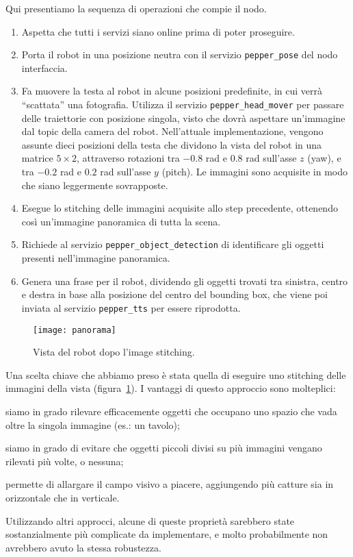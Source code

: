 Qui presentiamo la sequenza di operazioni che compie il nodo.
\begin{enumerate}
	\item Aspetta che tutti i servizi siano online prima di poter proseguire.
	\item Porta il robot in una posizione neutra con il servizio \verb|pepper_pose| del nodo interfaccia. 
	\item Fa muovere la testa al robot in alcune posizioni predefinite, in cui verrà ``scattata'' una fotografia. Utilizza il servizio \verb|pepper_head_mover| per passare delle traiettorie con posizione singola, visto che dovrà aspettare un'immagine dal topic della camera del robot. Nell'attuale implementazione, vengono assunte dieci posizioni della testa che dividono la vista del robot in una matrice $5 \times 2$, attraverso rotazioni tra $-0.8$ rad e $0.8$ rad sull'asse $z$ (yaw), e tra $-0.2$ rad e $0.2$ rad sull'asse $y$ (pitch). Le immagini sono acquisite in modo che siano leggermente sovrapposte.
	\item Esegue lo stitching delle immagini acquisite allo step precedente, ottenendo così un'immagine panoramica di tutta la scena.
	\item Richiede al servizio \verb|pepper_object_detection| di identificare gli oggetti presenti nell'immagine panoramica.
	\item Genera una frase per il robot, dividendo gli oggetti trovati tra sinistra, centro e destra in base alla posizione del centro del bounding box, che viene poi inviata al servizio \verb|pepper_tts| per essere riprodotta.
\end{enumerate}

\begin{figure}
	\centering
	\texttt{[image: panorama]}
	\caption{Vista del robot dopo l'image stitching.}\label{fig:panorama}
\end{figure}

Una scelta chiave che abbiamo preso è stata quella di eseguire uno stitching delle immagini della vista (figura~\ref{fig:panorama}). I vantaggi di questo approccio sono molteplici: \begin{enumerate*}[label={(\arabic*)}] \item siamo in grado rilevare efficacemente oggetti che occupano uno spazio che vada oltre la singola immagine (es.\@: un tavolo); \item siamo in grado di evitare che oggetti piccoli divisi su più immagini vengano rilevati più volte, o nessuna; \item permette di allargare il campo visivo a piacere, aggiungendo più catture sia in orizzontale che in verticale.\end{enumerate*} Utilizzando altri approcci, alcune di queste proprietà sarebbero state sostanzialmente più complicate da implementare, e molto probabilmente non avrebbero avuto la stessa robustezza.

